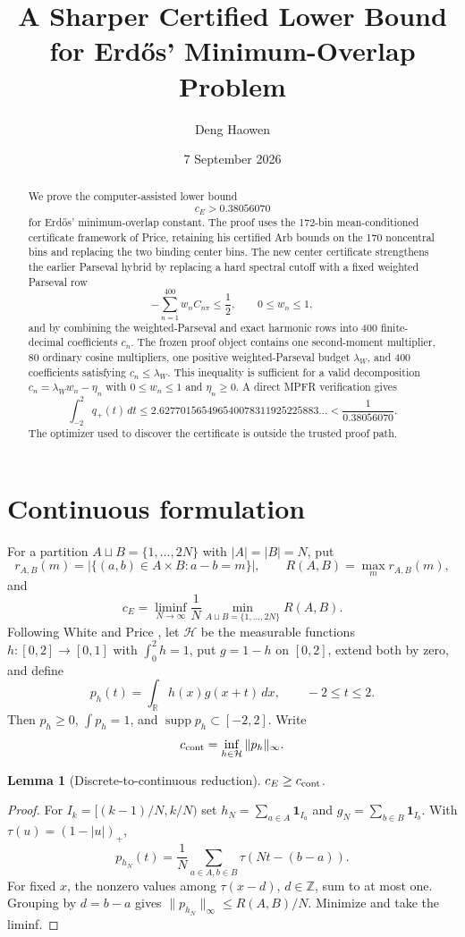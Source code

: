 \documentclass[11pt]{amsart}
\title{A Sharper Certified Lower Bound for Erd\H{o}s' Minimum-Overlap Problem}
\author{Deng Haowen}
\date{7 September 2026}
\newtheorem{lemma}[theorem]{Lemma}
\newcommand{\R}{\mathbb R}
\newcommand{\Z}{\mathbb Z}
\newcommand{\dd}{\,d}
\newcommand{\one}{\mathbf 1}
\begin{document}
\begin{abstract}
We prove the computer-assisted lower bound
\[
  c_E>0.38056070
\]
for Erd\H{o}s' minimum-overlap constant.  The proof uses the 172-bin
mean-conditioned certificate framework of Price, retaining his certified Arb
bounds on the 170 noncentral bins and replacing the two binding center bins.
The new center certificate strengthens the earlier Parseval hybrid by replacing
a hard spectral cutoff with a fixed weighted Parseval row
\[
 -\sum_{n=1}^{400}w_n C_{n\pi}\le\frac12,
 \qquad 0\le w_n\le1,
\]
and by combining the weighted-Parseval and exact harmonic rows into 400
finite-decimal coefficients $c_n$.  The frozen proof object contains one
second-moment multiplier, 80 ordinary cosine multipliers, one positive
weighted-Parseval budget $\lambda_W$, and 400 coefficients satisfying
$c_n\le\lambda_W$.  This inequality is sufficient for a valid decomposition
$c_n=\lambda_Ww_n-\eta_n$ with $0\le w_n\le1$ and $\eta_n\ge0$.
A direct MPFR verification gives
\[
 \int_{-2}^{2}q_+(t)\dd t
 \le 2.627701565496540078311925225883\ldots
 <\frac1{0.38056070}.
\]
The optimizer used to discover the certificate is outside the trusted proof
path.
\end{abstract}
\maketitle

\section{Continuous formulation}
For a partition $A\sqcup B=\{1,\ldots,2N\}$ with $|A|=|B|=N$, put
\[
 r_{A,B}(m)=|\{(a,b)\in A\times B:a-b=m\}|,
 \qquad R(A,B)=\max_m r_{A,B}(m),
\]
and
\[
 c_E=\liminf_{N\to\infty}\frac1N
 \min_{A\sqcup B=\{1,\ldots,2N\}}R(A,B).
\]
Following White and Price \cite{White2023,Price2026}, let $\mathcal H$ be the
measurable functions $h:[0,2]\to[0,1]$ with $\int_0^2h=1$, put $g=1-h$ on
$[0,2]$, extend both by zero, and define
\[
 p_h(t)=\int_{\R}h(x)g(x+t)\dd x,\qquad -2\le t\le2.
\]
Then $p_h\ge0$, $\int p_h=1$, and $\operatorname{supp}p_h\subset[-2,2]$.
Write
\[
 c_{\rm cont}=\inf_{h\in\mathcal H}\|p_h\|_\infty.
\]

\begin{lemma}[Discrete-to-continuous reduction]\label{lem:dc}
$c_E\ge c_{\rm cont}$.
\end{lemma}
\begin{proof}
For $I_k=[(k-1)/N,k/N)$ set
$h_N=\sum_{a\in A}\one_{I_a}$ and $g_N=\sum_{b\in B}\one_{I_b}$.
With $\tau(u)=(1-|u|)_+$,
\[
 p_{h_N}(t)=\frac1N\sum_{a\in A,b\in B}\tau(Nt-(b-a)).
\]
For fixed $x$, the nonzero values among $\tau(x-d)$, $d\in\Z$, sum to at most
one.  Grouping by $d=b-a$ gives
$\|p_{h_N}\|_\infty\le R(A,B)/N$.  Minimize and take the liminf.
\end{proof}
\end{document}

